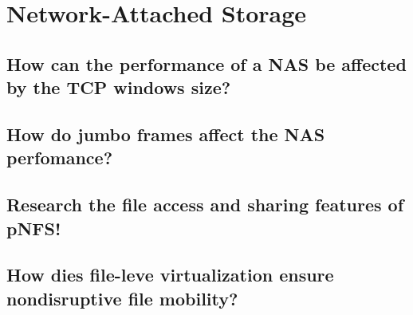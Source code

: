 \section{Network-Attached Storage} %
\label{sec:network_attached_storage}

\subsection{How can the performance of a NAS be affected by the TCP windows size?} %
\label{sub:how_can_the_performance_of_a_nas_be_affected_by_the_tcp_windows_size}

\subsection{How do jumbo frames affect the NAS perfomance?} %
\label{sub:how_do_jumbo_frames_affect_the_nas_perfomance}

\subsection{Research the file access and sharing features of pNFS!} %
\label{sub:research_the_file_access_and_sharing_features_of_pnfs}

\subsection{How dies file-leve virtualization ensure nondisruptive file mobility?} %
\label{sub:how_dies_file_leve_virtualization_ensure_nondisruptive_file_mobility}


